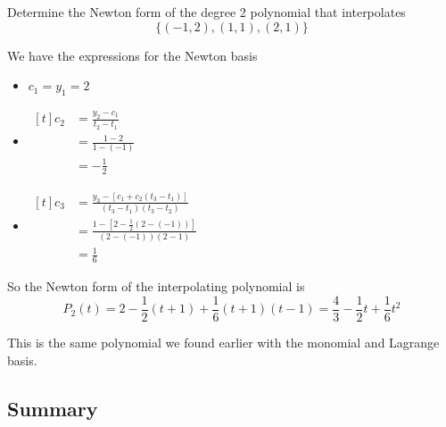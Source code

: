 \begin{example}
    Determine the Newton form of the degree 2 polynomial that interpolates \[
        \{ (-1, 2), (1, 1), (2, 1) \}
    \]

    We have the expressions for the Newton basis
    \begin{itemize}
        \item \( c_1 = y_1 = 2 \)
        \item \( \begin{aligned}[t]
                  c_2 & = \frac{y_2 - c_1}{t_2 - t_1} \\
                      & = \frac{1 - 2}{1 - (-1)}      \\
                      & = -\frac{1}{2}
              \end{aligned} \)
        \item \( \begin{aligned}[t]
                  c_3
                   & = \frac{y_3 - \left[ c_1 + c_2(t_3 - t_1) \right]}{(t_3 - t_1)(t_3 - t_2)}
                  \\
                   & = \frac{1 - \left[ 2 - \frac{1}{2}(2 - (-1)) \right]}{(2 - (-1))(2 - 1)}
                  \\
                   & = \frac{1}{6}
              \end{aligned} \)
    \end{itemize}

    So the Newton form of the interpolating polynomial is \[
        P_2(t) = 2 - \frac{1}{2}(t + 1) + \frac{1}{6}(t + 1)(t - 1) = \frac{4}{3} - \frac{1}{2}t + \frac{1}{6}t^2
    \]

    This is the same polynomial we found earlier with the monomial and Lagrange basis.
\end{example}

\subsection{Summary}


